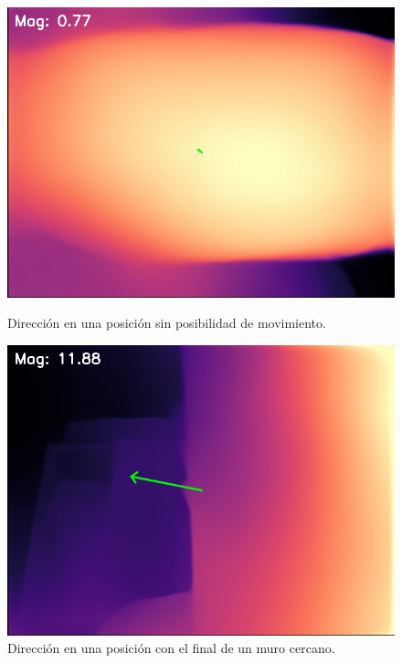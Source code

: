 \begin{figure}[h]
    \vspace{0.5cm} %

    \begin{minipage}{0.49\textwidth}
        \centering
        \includegraphics[width=\linewidth]{images/get_dir_nomove3.png}
        \caption{Dirección en una posición sin posibilidad de movimiento.}
        \label{fig:dir_nomove}
    \end{minipage}
    \hfill
    \begin{minipage}{0.49\textwidth}
        \centering
        \includegraphics[width=\linewidth]{images/get_dir_wall4.png}
        \caption{Dirección en una posición con el final de un muro cercano.}
        \label{fig:dir_wall}
    \end{minipage}
\end{figure}

